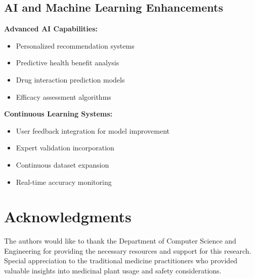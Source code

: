 \documentclass[conference]{IEEEtran}
\begin{document}
\subsection{AI and Machine Learning Enhancements}

\textbf{Advanced AI Capabilities:}
\begin{itemize}
\item Personalized recommendation systems
\item Predictive health benefit analysis
\item Drug interaction prediction models
\item Efficacy assessment algorithms
\end{itemize}

\textbf{Continuous Learning Systems:}
\begin{itemize}
\item User feedback integration for model improvement
\item Expert validation incorporation
\item Continuous dataset expansion
\item Real-time accuracy monitoring
\end{itemize}

\section{Acknowledgments}

The authors would like to thank the Department of Computer Science and Engineering for providing the necessary resources and support for this research. Special appreciation to the traditional medicine practitioners who provided valuable insights into medicinal plant usage and safety considerations.
\end{document}
